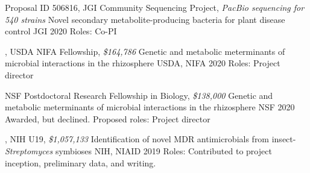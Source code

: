 

\begin{cventries}

\cventry
{Proposal ID 506816, JGI Community Sequencing Project, \textit{PacBio sequencing for 540 strains}}
{Novel secondary metabolite-producing bacteria for plant disease control}
{JGI}
{2020}
{Roles: Co-PI}

\cventry
{\textbf{\textit{}}, USDA NIFA Fellowship, \textit{\$164,786}}
{Genetic and metabolic meterminants of microbial interactions in the rhizosphere}
{USDA, NIFA}
{2020}
{Roles: Project director}

\cventry
{NSF Postdoctoral Research Fellowship in Biology, \textit{\$138,000}}
{Genetic and metabolic meterminants of microbial interactions in the rhizosphere}
{NSF}
{2020}
{Awarded, but declined. Proposed roles: Project director}

\cventry
{\textbf{\textit{}}, NIH U19, \textit{\$1,057,133}}
{Identification of novel MDR antimicrobials from insect-\textit{Streptomyces} symbioses}
{NIH, NIAID}
{2019}
{Roles: Contributed to project inception, preliminary data, and writing.}

\end{cventries}